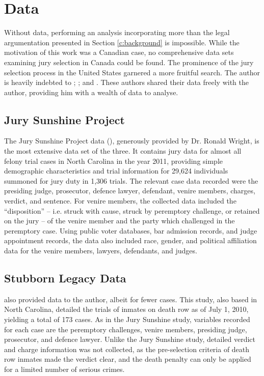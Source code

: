 \section{Data} \label{c:data}

Without data, performing an analysis incorporating more than the
legal argumentation presented in Section \ref{c:background} is impossible. While the motivation of this work was a Canadian case, no comprehensive
data sets examining jury selection in Canada could be found. The prominence of the jury selection process
in the United States garnered a more fruitful search. The author is heavily indebted to \citeauthor{JurySunshineProj}; \citeauthor{StubbornLegacy}; and
\citeauthor{PerempChalMurder}. These authors shared their data freely with the author, providing him with a wealth of data to
analyse.

\subsection{Jury Sunshine Project} \label{sec:jspdata}

The Jury Sunshine Project data (\cite{JurySunshineProj}), generously provided by Dr. Ronald Wright, is the most extensive data set of the three. It
contains jury data for almost all felony trial cases in North Carolina in the year 2011, providing simple demographic
characteristics and trial information for 29,624 individuals summoned
for jury duty in 1,306 trials. The relevant case data recorded were the presiding judge, prosecutor, defence lawyer, defendant, venire members,
charges, verdict, and sentence. For venire members, the collected data included the ``disposition'' -- i.e. struck with cause, struck by peremptory challenge, or retained on the jury -- of the venire member and the party which challenged in the peremptory case. Using public voter databases, bar admission records, and judge appointment records, the data also included race, gender, and political
affiliation data for the venire members, lawyers, defendants, and judges.

\subsection{Stubborn Legacy Data} \label{sec:norcardata}

\cite{StubbornLegacy} also provided data to the author, albeit for fewer cases. This study, also based in North Carolina,
detailed the trials of inmates on death row as of July 1, 2010, yielding a total of 173 cases. As in the Jury Sunshine study, variables recorded for each case are the peremptory challenges, venire members, presiding judge, prosecutor, and defence lawyer. Unlike the Jury Sunshine study, detailed verdict and charge information was not collected, as the pre-selection criteria of death row inmates made the verdict clear, and the death penalty can only be applied for a limited number of serious crimes.

